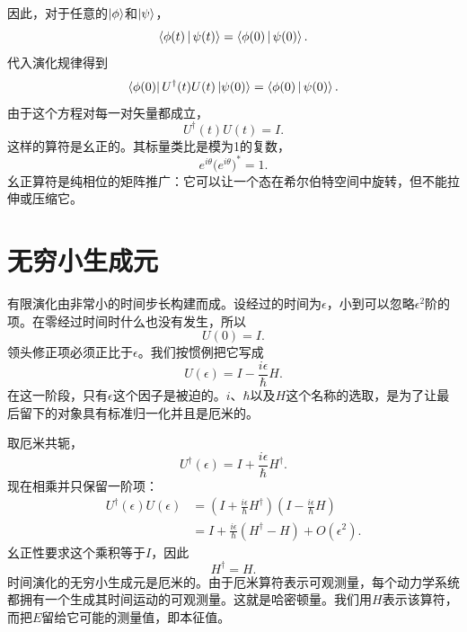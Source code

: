 因此，对于任意的\(\left\lvert\phi\right\rangle\)和\(\left\lvert\psi\right\rangle\)，
\begin{equation}
\left\langle\phi(t)\,\middle|\,\psi(t)\right\rangle
=
\left\langle\phi(0)\,\middle|\,\psi(0)\right\rangle.
\end{equation}
代入演化规律得到
\begin{equation}
\left\langle\phi(0)\right\rvert U^\dagger(t)U(t)\left\lvert\psi(0)\right\rangle
=
\left\langle\phi(0)\,\middle|\,\psi(0)\right\rangle.
\end{equation}
由于这个方程对每一对矢量都成立，
\begin{equation}
\boxed{U^\dagger(t)U(t)=I}.
\end{equation}
这样的算符是幺正的。其标量类比是模为1的复数，
\begin{equation}
e^{i\theta}\bigl(e^{i\theta}\bigr)^*=1.
\end{equation}
幺正算符是纯相位的矩阵推广：它可以让一个态在希尔伯特空间中旋转，但不能拉伸或压缩它。

\section{无穷小生成元}

有限演化由非常小的时间步长构建而成。设经过的时间为\(\epsilon\)，小到可以忽略\(\epsilon^2\)阶的项。在零经过时间时什么也没有发生，所以
\begin{equation}
U(0)=I.
\end{equation}
领头修正项必须正比于\(\epsilon\)。我们按惯例把它写成
\begin{equation}
\boxed{U(\epsilon)=I-\frac{i\epsilon}{\hbar}H}.
\end{equation}
在这一阶段，只有\(\epsilon\)这个因子是被迫的。\(i\)、\(\hbar\)以及\(H\)这个名称的选取，是为了让最后留下的对象具有标准归一化并且是厄米的。

\begin{classroomqa}
\end{classroomqa}

取厄米共轭，
\begin{equation}
U^\dagger(\epsilon)
=I+\frac{i\epsilon}{\hbar}H^\dagger.
\end{equation}
现在相乘并只保留一阶项：
\begin{align}
U^\dagger(\epsilon)U(\epsilon)
&=
\left(I+\frac{i\epsilon}{\hbar}H^\dagger\right)
\left(I-\frac{i\epsilon}{\hbar}H\right) \\
&=
I+\frac{i\epsilon}{\hbar}\left(H^\dagger-H\right)
+O(\epsilon^2).
\end{align}
幺正性要求这个乘积等于\(I\)，因此
\begin{equation}
\boxed{H^\dagger=H}.
\end{equation}
时间演化的无穷小生成元是厄米的。由于厄米算符表示可观测量，每个动力学系统都拥有一个生成其时间运动的可观测量。这就是哈密顿量。我们用\(H\)表示该算符，而把\(E\)留给它可能的测量值，即本征值。

